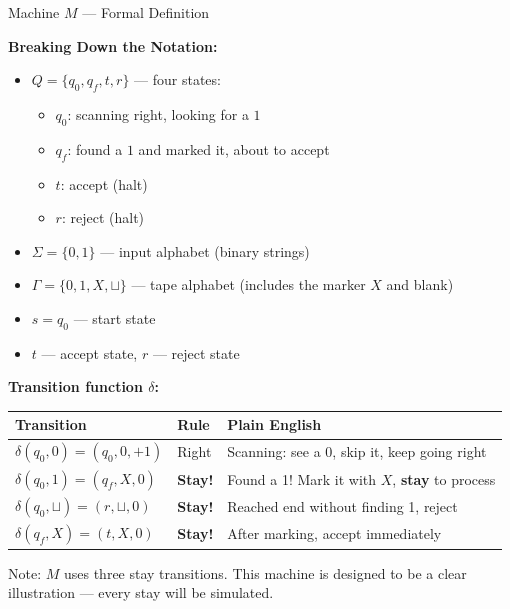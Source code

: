 \begin{definitionbox}{Machine $M$ --- Formal Definition}

\textbf{Breaking Down the Notation:}
\begin{itemize}[nosep]
\item $Q = \{q_0, q_f, t, r\}$ --- four states:
  \begin{itemize}[nosep]
  \item $q_0$: scanning right, looking for a $1$
  \item $q_f$: found a $1$ and marked it, about to accept
  \item $t$: accept (halt)
  \item $r$: reject (halt)
  \end{itemize}
\item $\Sigma = \{0, 1\}$ --- input alphabet (binary strings)
\item $\Gamma = \{0, 1, X, \sqcup\}$ --- tape alphabet (includes the marker $X$ and blank)
\item $s = q_0$ --- start state
\item $t$ --- accept state, $r$ --- reject state
\end{itemize}

\textbf{Transition function $\delta$:}

\begin{center}
\begin{tabular}{lll}
\toprule
\textbf{Transition} & \textbf{Rule} & \textbf{Plain English} \\
\midrule
$\delta(q_0, 0) = (q_0, 0, +1)$ & Right & Scanning: see a 0, skip it, keep going right \\
$\delta(q_0, 1) = (q_f, X, 0)$  & \textbf{Stay!} & Found a 1! Mark it with $X$, \textbf{stay} to process \\
$\delta(q_0, \sqcup) = (r, \sqcup, 0)$ & \textbf{Stay!} & Reached end without finding 1, reject \\
$\delta(q_f, X) = (t, X, 0)$    & \textbf{Stay!} & After marking, accept immediately \\
\bottomrule
\end{tabular}
\end{center}

Note: $M$ uses three stay transitions. This machine is designed to be a clear illustration --- every stay will be simulated.
\end{definitionbox}

